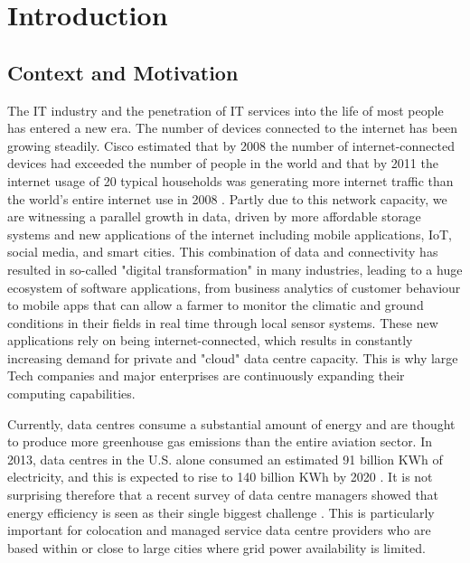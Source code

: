 \chapter{Introduction}
\label{chapter:introduction}

\section{Context and Motivation}

The IT industry and the penetration of IT services into the life of most people has entered a new era. The number of devices connected to the internet has been growing steadily.  Cisco estimated that by 2008 the number of internet-connected devices had exceeded the number of people in the world and that by 2011 the internet usage of 20 typical households was generating more internet traffic than the world's entire  internet use in 2008 \cite{evans2008-iotinfo}. Partly due to this network capacity, we are witnessing a parallel growth in data, driven by more affordable storage systems and  new applications of the internet including mobile applications, IoT, social media, and smart cities.  This combination of data and connectivity has resulted in so-called "digital transformation" in many industries, leading to a huge ecosystem of software applications, from business analytics of customer behaviour to mobile apps that can allow a farmer to monitor the climatic and ground conditions in their fields in real time through local sensor systems. These new applications rely on being internet-connected, which results in constantly increasing demand for private and "cloud" data centre capacity.  This is why large Tech companies and major enterprises are continuously expanding their computing capabilities. 

Currently, data centres consume a substantial amount of energy and are thought to produce more greenhouse gas emissions than the entire aviation sector. In 2013, data centres in the U.S. alone consumed an estimated 91 billion KWh of electricity, and this is expected to rise to 140 billion KWh by 2020 \cite{delforge2014-datacentreenergy}. It is not surprising therefore that a recent survey of data centre managers showed that energy efficiency is seen as their single biggest challenge \cite{cainc2016-ausdcenergy}. This is particularly important for colocation and managed service data centre providers who are based within or close to large cities where grid power availability is limited.

